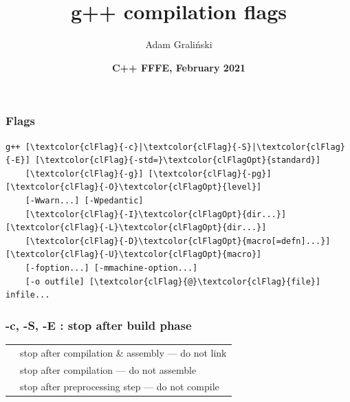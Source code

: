 \documentclass{beamer}
\title[LTN02 :: CompilationFlags]{g++ compilation flags}
\author{Adam Graliński}
\date[FFFE\_21]{\textbf{C++ {\color{red}F}{\color{blue}F}{\color{green}F}{\color{yellow}E}, February 2021}}
\begin{document}
{
\begin{frame}
\titlepage{}
\end{frame}
}

\begin{frame}[fragile]
\frametitle{Flags}

\centering
\begin{BVerbatim}[commandchars=\\\{\}]
g++ [\textcolor{clFlag}{-c}|\textcolor{clFlag}{-S}|\textcolor{clFlag}{-E}] [\textcolor{clFlag}{-std=}\textcolor{clFlagOpt}{standard}]
    [\textcolor{clFlag}{-g}] [\textcolor{clFlag}{-pg}] [\textcolor{clFlag}{-O}\textcolor{clFlagOpt}{level}]
    [-Wwarn...] [-Wpedantic]
    [\textcolor{clFlag}{-I}\textcolor{clFlagOpt}{dir...}] [\textcolor{clFlag}{-L}\textcolor{clFlagOpt}{dir...}]
    [\textcolor{clFlag}{-D}\textcolor{clFlagOpt}{macro[=defn]...}] [\textcolor{clFlag}{-U}\textcolor{clFlagOpt}{macro}]
    [-foption...] [-mmachine-option...]
    [-o outfile] [\textcolor{clFlag}{@}\textcolor{clFlag}{file}] infile...
\end{BVerbatim}
\end{frame}

\begin{frame}
\frametitle{-c, -S, -E : stop after build phase}
\begin{table}
\begin{tabular}{l l}
\toprule
\texttt{\color{clFlag}{-c}} & stop after compilation \& assembly --- do not link \\ [3ex]
\texttt{\color{clFlag}{-S}} & stop after compilation --- do not assemble \\ [3ex]
\texttt{\color{clFlag}{-E}} & stop after preprocessing step --- do not compile \\ [3ex]
\bottomrule
\end{tabular}
\end{table}
\end{frame}
\end{document}
